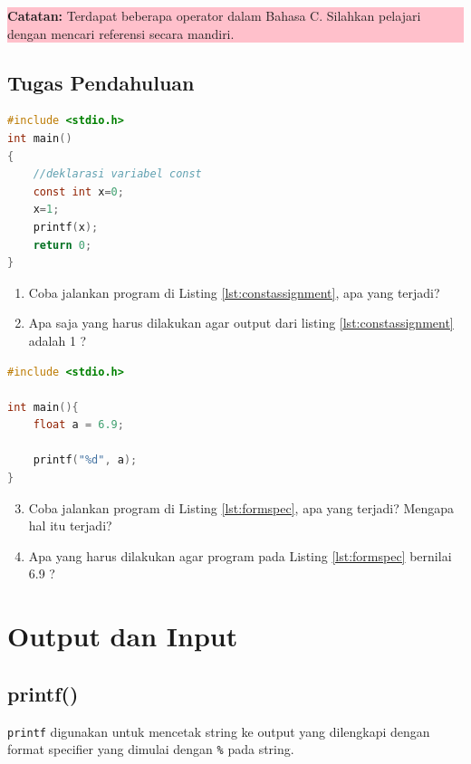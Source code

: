 \begin{center}
	\colorbox{pink}{\parbox{0.8\linewidth}{\textbf{Catatan:} Terdapat beberapa operator dalam Bahasa C. Silahkan pelajari dengan mencari referensi secara mandiri.}}
\end{center}

\subsection{Tugas Pendahuluan}
\begin{lstlisting}[language=c,caption=Menggunakan operator penugasan pada variabel const,label=lst:constassignment,captionpos=t]
#include <stdio.h>
int main()
{
    //deklarasi variabel const
    const int x=0;
    x=1;
	printf(x);
	return 0;
}
\end{lstlisting}
\begin{enumerate}
	\item Coba jalankan program di Listing \ref{lst:constassignment}, apa yang terjadi?
	\item Apa saja yang harus dilakukan agar output dari listing \ref{lst:constassignment} adalah 1 ?
\end{enumerate}

\begin{lstlisting}[language=c,caption=Menganalisa tipe data dan format specifier,label=lst:formspec,captionpos=t]
#include <stdio.h>

int main(){
    float a = 6.9;

    printf("%d", a);
}
\end{lstlisting}

\begin{enumerate}
	\setcounter{enumi}{2}
	\item Coba jalankan program  di Listing \ref{lst:formspec}, apa yang terjadi? Mengapa hal itu terjadi?
	\item Apa yang harus dilakukan agar program pada Listing \ref{lst:formspec} bernilai 6.9 ?
\end{enumerate}

\section{Output dan Input}

\subsection{printf()}
\verb*|printf|  digunakan untuk mencetak string  ke output yang dilengkapi dengan format specifier yang dimulai dengan \verb*|%| pada string.

